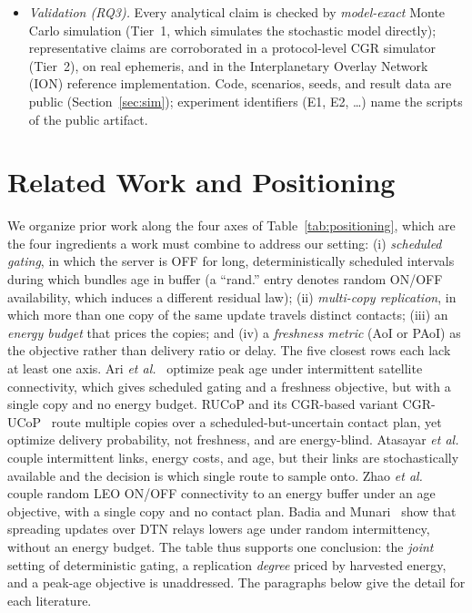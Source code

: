 \documentclass[twocolumn,3p,times,procedia]{elsarticle}
\theoremstyle{plain}
\theoremstyle{remark}
\newcommand{\E}{\mathbb{E}}
\begin{document}
\begin{itemize}
decision rules in the style of energy-aware CGR (E-CGR) and RUCoP are given for the instances tested
(Sections~\ref{sec:policy} and~\ref{sec:sim}). On real Iridium-NEXT
ephemeris the route-set \emph{latency-diversity potential}, measured by
the residual-min ratio $\E[R_{\min,2}]/\E[R_1]$, spans $0.41$--$0.95$
with the pass-phase alignment of the satellite pair; because contact
plans are known in advance, the alignment is computable at planning
time and turns the independence assumption into a placement criterion.
\item \emph{Validation (RQ3).} Every analytical claim is checked by
\emph{model-exact} Monte Carlo simulation (Tier~1, which simulates the
stochastic model directly); representative claims are corroborated in a
protocol-level CGR simulator (Tier~2), on real ephemeris, and in the
Interplanetary Overlay Network (ION) reference implementation. Code,
scenarios, seeds, and result data are public (Section~\ref{sec:sim});
experiment identifiers (E1, E2, \dots) name the scripts of the public
artifact.
\end{itemize}

\section{Related Work and Positioning}\label{sec:related}
We organize prior work along the four axes of
Table~\ref{tab:positioning}, which are the four ingredients a work must
combine to address our setting: (i) \emph{scheduled gating}, in which
the server is OFF for long, deterministically scheduled intervals during
which bundles age in buffer (a ``rand.'' entry denotes random ON/OFF
availability, which induces a different residual law); (ii)
\emph{multi-copy replication}, in which more than one copy of the same
update travels distinct contacts; (iii) an \emph{energy budget} that
prices the copies; and (iv) a \emph{freshness metric} (AoI or PAoI) as
the objective rather than delivery ratio or delay. The five closest rows
each lack at least one axis. Ari \emph{et al.}~\cite{ari} optimize peak
age under intermittent satellite connectivity, which gives scheduled
gating and a freshness objective, but with a single copy and no energy
budget.
RUCoP and its CGR-based variant CGR-UCoP~\cite{rucop} route multiple copies over a
scheduled-but-uncertain contact plan, yet optimize delivery
probability, not freshness, and are energy-blind. Atasayar \emph{et
al.}~\cite{atasayar2025} couple intermittent links, energy costs, and
age, but their links are stochastically available and the decision is
which single route to sample onto. Zhao \emph{et
al.}~\cite{zhao2026aoi} couple random LEO ON/OFF connectivity to an
energy buffer under an age objective, with a single copy and no contact
plan. Badia and Munari~\cite{badia2025globecom} show that spreading
updates over DTN relays lowers age under random intermittency, without
an energy budget. The table thus supports one conclusion: the
\emph{joint} setting of deterministic gating, a replication
\emph{degree} priced by harvested energy, and a peak-age objective is
unaddressed. The paragraphs below give the detail for each literature.
\end{document}
